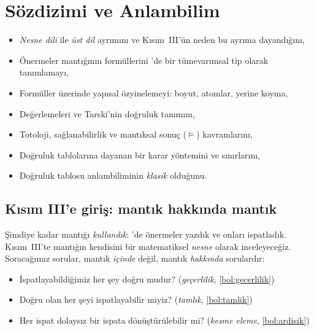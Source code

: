 \chapter{Sözdizimi ve Anlambilim}\label{bol:sozdizim}

\begin{bolumhedefleri}
\begin{itemize}
  \item \emph{Nesne dili} ile \emph{üst dil} ayrımını ve Kısım~III'ün
        neden bu ayrıma dayandığını,
  \item Önermeler mantığının formüllerini \Lean{}'de bir tümevarımsal
        tip olarak tanımlamayı,
  \item Formüller üzerinde yapısal özyinelemeyi: boyut, atomlar,
        yerine koyma,
  \item Değerlemeleri ve Tarski'nin doğruluk tanımını,
  \item Totoloji, sağlanabilirlik ve mantıksal sonuç ($\models$)
        kavramlarını,
  \item Doğruluk tablolarına dayanan bir karar yöntemini ve sınırlarını,
  \item Doğruluk tablosu anlambiliminin \emph{klasik} olduğunu.
\end{itemize}
\end{bolumhedefleri}

\section{Kısım III'e giriş: mantık hakkında mantık}\label{sec:kisim3-giris}

Şimdiye kadar mantığı \emph{kullandık}: \Lean{}'de önermeler yazdık ve
onları ispatladık. Kısım~III'te mantığın kendisini bir matematiksel
\emph{nesne} olarak inceleyeceğiz. Soracağımız sorular, mantık
\emph{içinde} değil, mantık \emph{hakkında} sorulardır:

\begin{itemize}
  \item İspatlayabildiğimiz her şey doğru mudur? (\emph{geçerlilik},
        \cref{bol:gecerlilik})
  \item Doğru olan her şeyi ispatlayabilir miyiz? (\emph{tamlık},
        \cref{bol:tamlik})
  \item Her ispat dolaysız bir ispata dönüştürülebilir mi?
        (\emph{kesme eleme}, \cref{bol:ardisik})
\end{itemize}

